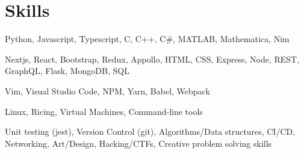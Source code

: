 \section{Skills}
{Python, Javascript, Typescript, C, C++, C\#, MATLAB, Mathematica, Nim}

{Nextjs, React, Bootstrap, Redux, Appollo, HTML, CSS, Express, Node, REST, GraphQL, Flask, MongoDB, SQL}

{Vim, Visual Studio Code, NPM, Yarn, Babel, Webpack}

{Linux, Ricing, Virtual Machines, Command-line tools}

{Unit testing (jest), Version Control (git), Algorithms/Data structures, CI/CD, Networking, Art/Design, Hacking/CTFs, Creative problem solving skills}
